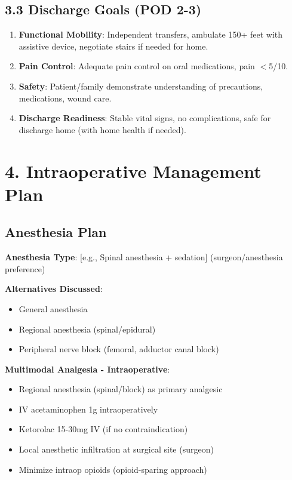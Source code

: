 \documentclass[11pt,letterpaper]{article}
\begin{document}
\subsection*{3.3 Discharge Goals (POD 2-3)}

\begin{enumerate}[leftmargin=*]
    \item \textbf{Functional Mobility}: Independent transfers, ambulate 150+ feet with assistive device, negotiate stairs if needed for home.

    \item \textbf{Pain Control}: Adequate pain control on oral medications, pain $<$5/10.

    \item \textbf{Safety}: Patient/family demonstrate understanding of precautions, medications, wound care.

    \item \textbf{Discharge Readiness}: Stable vital signs, no complications, safe for discharge home (with home health if needed).
\end{enumerate}

\section*{4. Intraoperative Management Plan}

\subsection*{Anesthesia Plan}

\textbf{Anesthesia Type}: [e.g., Spinal anesthesia + sedation] (surgeon/anesthesia preference)

\textbf{Alternatives Discussed}:
\begin{itemize}[leftmargin=*]
    \item General anesthesia
    \item Regional anesthesia (spinal/epidural)
    \item Peripheral nerve block (femoral, adductor canal block)
\end{itemize}

\textbf{Multimodal Analgesia - Intraoperative}:
\begin{itemize}[leftmargin=*]
    \item Regional anesthesia (spinal/block) as primary analgesic
    \item IV acetaminophen 1g intraoperatively
    \item Ketorolac 15-30mg IV (if no contraindication)
    \item Local anesthetic infiltration at surgical site (surgeon)
    \item Minimize intraop opioids (opioid-sparing approach)
\end{itemize}
\end{document}
